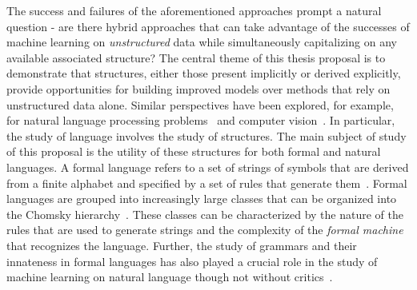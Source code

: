 %
The success and failures of the aforementioned approaches prompt a natural question - are there hybrid approaches that can take advantage of the successes of machine learning on \textit{unstructured} data while simultaneously capitalizing on any available associated structure?
The central theme of this thesis proposal is to demonstrate that structures, either those present implicitly or derived explicitly, provide opportunities for building improved models over methods that rely on unstructured data alone.
Similar perspectives have been explored, for example, for natural language processing problems~\citep{wu2021graph} and computer vision~\citep{johnson2018image}.
In particular, the study of language involves the study of structures. 
The main subject of study of this proposal is the utility of these structures for both formal and natural languages.
A formal language refers to a set of strings of symbols that are derived from a finite alphabet and specified by a set of rules that generate them~\citep{scott2000programming}.
Formal languages are grouped into increasingly large classes that can be organized into the Chomsky hierarchy~\citep{chomsky1956three}.
These classes can be characterized by the nature of the rules that are used to generate strings and the complexity of the \textit{formal machine} that recognizes the language.
Further, the study of grammars and their innateness in formal languages has also played a crucial role in the study of machine learning on natural language  though not without critics~\citep{pullum2002empirical,linzen2021syntactic}.


